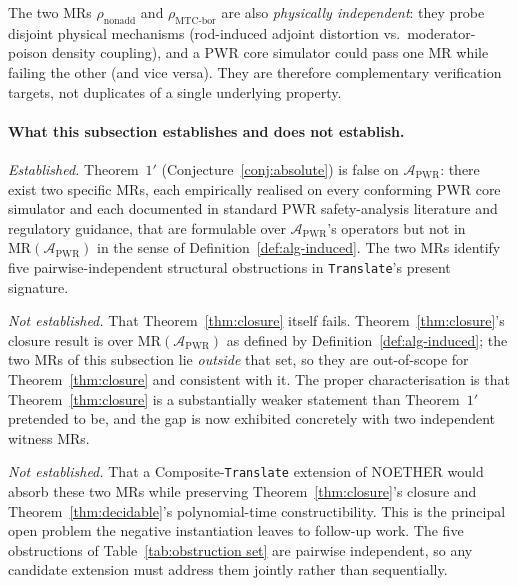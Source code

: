 \documentclass[manuscript]{acmart}
\begin{document}
The two MRs $\rho_{\mathrm{nonadd}}$ and $\rho_{\mathrm{MTC\text{-}bor}}$ are also \emph{physically independent}: they probe disjoint physical mechanisms (rod-induced adjoint distortion vs.\ moderator-poison density coupling), and a PWR core simulator could pass one MR while failing the other (and vice versa). They are therefore complementary verification targets, not duplicates of a single underlying property.

\paragraph{What this subsection establishes and does not establish.}
\emph{Established.} Theorem~$1'$ (Conjecture~\ref{conj:absolute}) is false on $\mathcal{A}_{\mathrm{PWR}}$: there exist two specific MRs, each empirically realised on every conforming PWR core simulator and each documented in standard PWR safety-analysis literature and regulatory guidance, that are formulable over $\mathcal{A}_{\mathrm{PWR}}$'s operators but not in $\mathrm{MR}(\mathcal{A}_{\mathrm{PWR}})$ in the sense of Definition~\ref{def:alg-induced}. The two MRs identify five pairwise-independent structural obstructions in \texttt{Translate}'s present signature.

\emph{Not established.} That Theorem~\ref{thm:closure} itself fails. Theorem~\ref{thm:closure}'s closure result is over $\mathrm{MR}(\mathcal{A}_{\mathrm{PWR}})$ as defined by Definition~\ref{def:alg-induced}; the two MRs of this subsection lie \emph{outside} that set, so they are out-of-scope for Theorem~\ref{thm:closure} and consistent with it. The proper characterisation is that Theorem~\ref{thm:closure} is a substantially weaker statement than Theorem~$1'$ pretended to be, and the gap is now exhibited concretely with two independent witness MRs.

\emph{Not established.} That a Composite-\texttt{Translate} extension of NOETHER would absorb these two MRs while preserving Theorem~\ref{thm:closure}'s closure and Theorem~\ref{thm:decidable}'s polynomial-time constructibility. This is the principal open problem the negative instantiation leaves to follow-up work. The five obstructions of Table~\ref{tab:obstruction set} are pairwise independent, so any candidate extension must address them jointly rather than sequentially.


\end{document}
